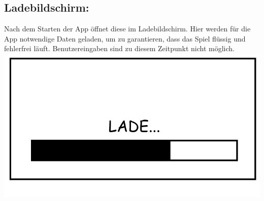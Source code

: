 \documentclass{scrartcl}
\begin{document}
\begin{enumerate}
	\begin{minipage}{1\textwidth}
		\item \subsection*{Ladebildschirm:} \label{appaufbau:Ladebildschirm}
		Nach dem Starten der App öffnet diese im Ladebildschirm. Hier werden für die App notwendige Daten geladen, um zu garantieren, dass das Spiel flüssig und fehlerfrei läuft. Benutzereingaben sind zu diesem Zeitpunkt nicht möglich.\\
		\includegraphics[scale=0.5]{assets/LoadScreen}
	\end{minipage}
	
	\begin{minipage}{1\textwidth}
		

\end{minipage}
\end{enumerate}
\end{document}
